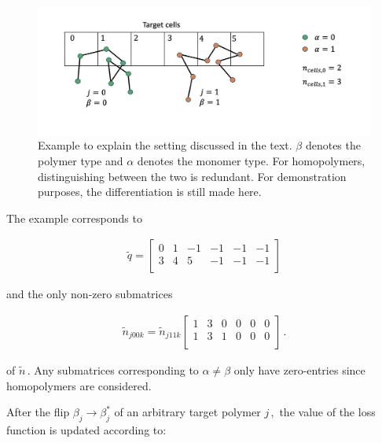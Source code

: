 \documentclass[bachelor,       %
               oneside,        %
               BCOR10mm,       %
               ngerman, english %
               ]{GAUBM}
\begin{document}
\begin{figure}[h]
    \centering
    \includegraphics[width=
    \linewidth]{figures/cell_info.png}
    \caption{Example to explain the setting discussed in the text. $\beta$ denotes the polymer type and $\alpha$ denotes the monomer type. For homopolymers, distinguishing between the two is redundant. For demonstration purposes, the differentiation is still made here.}
    \label{fig:cell_info}
\end{figure}

The example corresponds to

\begin{align*}
    \tilde q=
    \begin{bmatrix}
    0 & 1 & -1 & -1 & -1 & -1 \\
    3 & 4 & 5 & -1 & -1 & -1 \\
    \end{bmatrix}
\end{align*}

and the only non-zero submatrices

\begin{align*}
    \tilde n_{j00k}=\tilde n_{j11k}
    \begin{bmatrix}
    1 & 3 & 0 & 0 & 0 & 0 \\
    1 & 3 & 1 & 0 & 0& 0 \\
    \end{bmatrix}\,.
\end{align*}

of $\tilde n\,.$ Any submatrices corresponding to $\alpha\neq\beta$ only have zero-entries since homopolymers are considered.

After the flip $\beta_j\rightarrow \beta_j^*$ of an arbitrary target polymer $j\,,$ the value of the loss function is updated according to:
\end{document}
